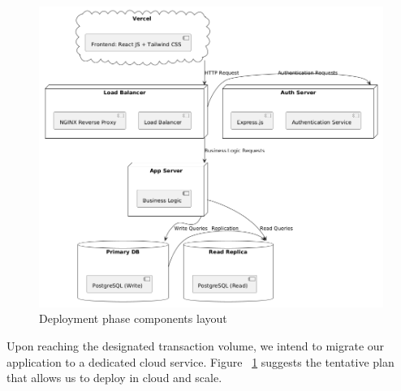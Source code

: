 \begin{figure}[!h]
	\centering
	\includegraphics[width=1\textwidth]{chapters/ch-04/402_deploy_cloud.png} %
	\caption{Deployment phase components layout}
	\label{fig:deploy_2} %
\end{figure}


Upon reaching the designated transaction volume, we intend to migrate our application to a dedicated cloud service. Figure ~\ref{fig:deploy_2} suggests the tentative plan that allows us to deploy in cloud and scale.

\clearpage